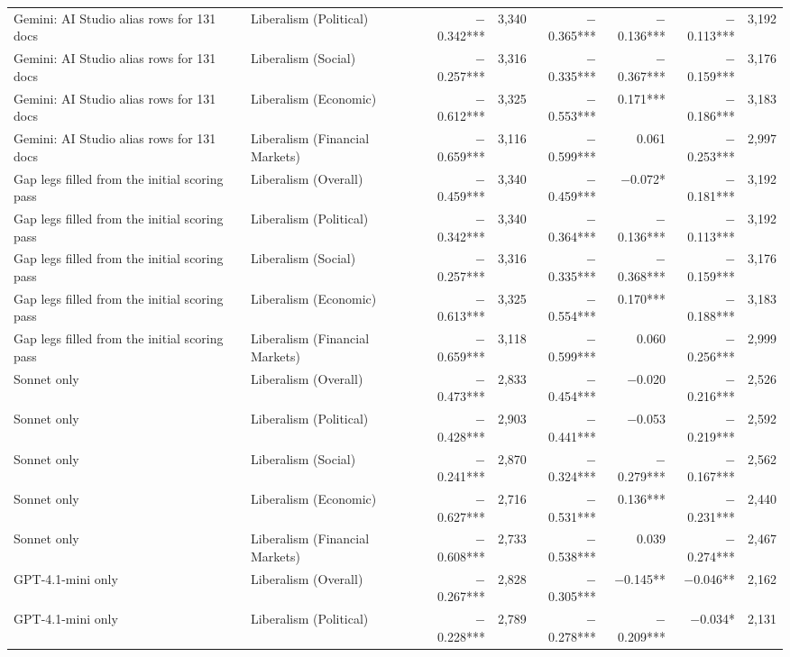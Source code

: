 \begin{table}[ht]
{\begin{tabular}{llrrrrrr}
Gemini: AI Studio alias rows for 131 docs & Liberalism (Political) & $-$0.342*** & 3,340 & $-$0.365*** & $-$0.136*** & $-$0.113*** & 3,192 \\
Gemini: AI Studio alias rows for 131 docs & Liberalism (Social) & $-$0.257*** & 3,316 & $-$0.335*** & $-$0.367*** & $-$0.159*** & 3,176 \\
Gemini: AI Studio alias rows for 131 docs & Liberalism (Economic) & $-$0.612*** & 3,325 & $-$0.553*** & 0.171*** & $-$0.186*** & 3,183 \\
Gemini: AI Studio alias rows for 131 docs & Liberalism (Financial Markets) & $-$0.659*** & 3,116 & $-$0.599*** & 0.061 & $-$0.253*** & 2,997 \\
Gap legs filled from the initial scoring pass & Liberalism (Overall) & $-$0.459*** & 3,340 & $-$0.459*** & $-$0.072* & $-$0.181*** & 3,192 \\
Gap legs filled from the initial scoring pass & Liberalism (Political) & $-$0.342*** & 3,340 & $-$0.364*** & $-$0.136*** & $-$0.113*** & 3,192 \\
Gap legs filled from the initial scoring pass & Liberalism (Social) & $-$0.257*** & 3,316 & $-$0.335*** & $-$0.368*** & $-$0.159*** & 3,176 \\
Gap legs filled from the initial scoring pass & Liberalism (Economic) & $-$0.613*** & 3,325 & $-$0.554*** & 0.170*** & $-$0.188*** & 3,183 \\
Gap legs filled from the initial scoring pass & Liberalism (Financial Markets) & $-$0.659*** & 3,118 & $-$0.599*** & 0.060 & $-$0.256*** & 2,999 \\
Sonnet only & Liberalism (Overall) & $-$0.473*** & 2,833 & $-$0.454*** & $-$0.020 & $-$0.216*** & 2,526 \\
Sonnet only & Liberalism (Political) & $-$0.428*** & 2,903 & $-$0.441*** & $-$0.053 & $-$0.219*** & 2,592 \\
Sonnet only & Liberalism (Social) & $-$0.241*** & 2,870 & $-$0.324*** & $-$0.279*** & $-$0.167*** & 2,562 \\
Sonnet only & Liberalism (Economic) & $-$0.627*** & 2,716 & $-$0.531*** & 0.136*** & $-$0.231*** & 2,440 \\
Sonnet only & Liberalism (Financial Markets) & $-$0.608*** & 2,733 & $-$0.538*** & 0.039 & $-$0.274*** & 2,467 \\
GPT-4.1-mini only & Liberalism (Overall) & $-$0.267*** & 2,828 & $-$0.305*** & $-$0.145** & $-$0.046** & 2,162 \\
GPT-4.1-mini only & Liberalism (Political) & $-$0.228*** & 2,789 & $-$0.278*** & $-$0.209*** & $-$0.034* & 2,131 \\

\end{tabular}}
\end{table}

